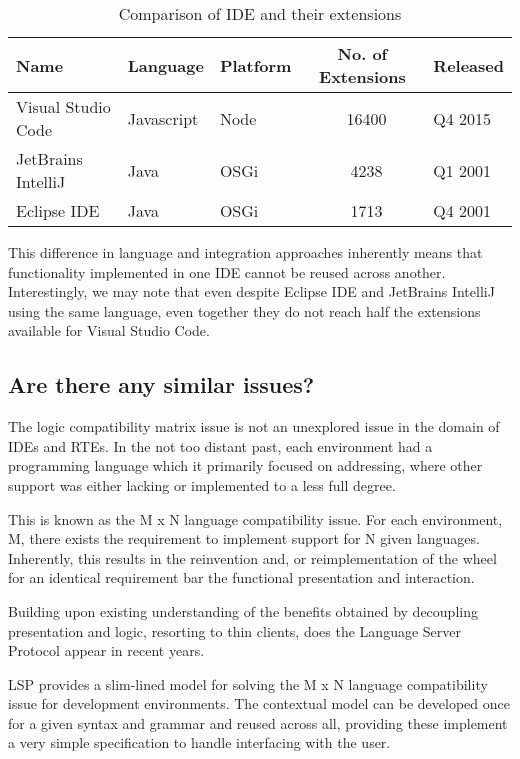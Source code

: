 


\begin{table}[h!]
\centering
\begin{tabular}{|l|l|l|c|l|}
	\hline 
	\rule[-1ex]{0pt}{2.5ex} Name & Language & Platform & No. of Extensions & Released \\ 
	\hline 
	\hline 
	\rule[-1ex]{0pt}{2.5ex} Visual Studio Code & Javascript & Node & ~16400 & Q4 2015\\ 
	\hline 
	\rule[-1ex]{0pt}{2.5ex} JetBrains IntelliJ & Java & OSGi  & ~4238 & Q1 2001 \\ 
	\hline 
	\rule[-1ex]{0pt}{2.5ex} Eclipse IDE & Java & OSGi & ~1713 & Q4 2001 \\ 
	\hline 
\end{tabular} 
\caption{Comparison of IDE and their extensions}
\end{table}

This difference in language and integration approaches inherently means that functionality implemented in one IDE cannot be reused across another. Interestingly, we may note that even despite Eclipse IDE and JetBrains IntelliJ using the same language, even together they do not reach half the extensions available for Visual Studio Code.

\subsection{Are there any similar issues?}

The logic compatibility matrix issue is not an unexplored issue in the domain of IDEs and RTEs. In the not too distant past, each environment had a programming language which it primarily focused on addressing, where other support was either lacking or implemented to a less full degree. 

This is known as the M x N language compatibility issue. For each environment, M, there exists the requirement to implement support for N given languages. Inherently, this results in the reinvention and, or reimplementation of the wheel for an identical requirement bar the functional presentation and interaction.

Building upon existing understanding of the benefits obtained by decoupling presentation and logic, resorting to thin clients, does the Language Server Protocol \parencite{lspGitHubSiteMSFT} appear in recent years.

LSP provides a slim-lined model for solving the M x N language compatibility issue for development environments. The contextual model can be developed once for a given syntax and grammar and reused across all, providing these implement a very simple specification to handle interfacing with the user.

